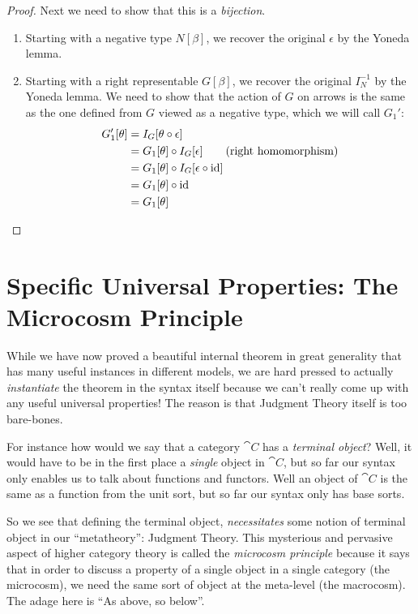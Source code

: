 \documentclass{article}
\begin{document}
\begin{proof}
  Next we need to show that this is a \emph{bijection}.
  \begin{enumerate}
  \item Starting with a negative type $N[\beta]$, we recover the
    original $\epsilon$ by the Yoneda lemma.
  \item Starting with a right representable $G[\beta]$, we recover the
    original $I_N^{-1}$ by the Yoneda lemma. We need to show that the
    action of $G$ on arrows is the same as the one defined from $G$
    viewed as a negative type, which we will call $G_1'$:
    \begin{align*}
      G_1'[\theta] &= I_G[\theta \circ \epsilon]\\
      &= G_1[\theta] \circ I_G[\epsilon]\tag{right homomorphism}\\
      &= G_1[\theta] \circ I_G[\epsilon \circ \text{id}]\\
      &= G_1[\theta] \circ \text{id}\\
      &= G_1[\theta]
    \end{align*}
  \end{enumerate}
\end{proof}

\section{Specific Universal Properties: The Microcosm Principle}

While we have now proved a beautiful internal theorem in great
generality that has many useful instances in different models, we are
hard pressed to actually \emph{instantiate} the theorem in the syntax
itself because we can't really come up with any useful universal properties!
The reason is that Judgment Theory itself is too bare-bones.

For instance how would we say that a category $\cat C$ has a
\emph{terminal object}? Well, it would have to be in the first place a
\emph{single} object in $\cat C$, but so far our syntax only enables
us to talk about functions and functors. Well an object of $\cat C$ is
the same as a function from the unit sort, but so far our syntax only
has base sorts.

So we see that defining the terminal object, \emph{necessitates} some
notion of terminal object in our ``metatheory'': Judgment Theory.
This mysterious and pervasive aspect of higher category theory is
called the \emph{microcosm principle} because it says that in order to
discuss a property of a single object in a single category (the
microcosm), we need the same sort of object at the meta-level (the
macrocosm).
The adage here is ``As above, so below''.
\end{document}
